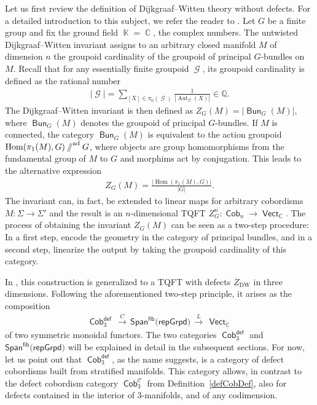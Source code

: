 \documentclass[pdftex]{sigma}
\DeclareMathOperator{\Hom}{Hom}
\DeclareMathOperator{\Aut}{Aut}
\DeclareMathOperator{\Bun}{\mathsf{Bun}}
\DeclareMathOperator{\vect}{\mathsf{Vect}}
\DeclareMathOperator{\K}{\mathbb{K}}
\DeclareMathOperator{\C}{\mathbb{C}}
\DeclareMathOperator{\Cob}{\mathsf{Cob}}
\DeclareMathOperator{\calc}{\mathcal{C}}
\DeclareMathOperator{\calg}{\mathcal{G}}
\newcommand{\sslash}{\mathbin{/\mkern-6mu/}}
\numberwithin{equation}{section}
\theoremstyle{definition}
\begin{document}
Let us first review the definition of Dijkgraaf--Witten theory without defects. For a detailed introduction to this subject, we refer the reader to \cite{FSW}. Let $G$ be a finite group and fix the ground field $\K = \C$, the complex numbers. The untwisted Dijkgraaf--Witten invariant assigns to an arbitrary closed manifold $M$ of dimension $n$ the groupoid cardinality of the groupoid of principal $G$-bundles on $M$. Recall that for any essentially finite groupoid $\calg$, its groupoid cardinality is defined as the rational number
\begin{align}
 \label{eqGrCard}
 |\calg| = \sum_{[X] \in \pi_0(\calg)}\frac{1}{|{\Aut_{\calg}(X)}|} \in \mathbb{Q}.
\end{align}
The Dijkgraaf--Witten invariant is then defined as $Z_G(M) = |{\Bun_G(M)}|$, where $\Bun_G(M)$ denotes the groupoid of principal $G$-bundles. If $M$ is connected, the category $\Bun_G(M)$ is equivalent to the action groupoid $\Hom(\pi_1(M), G)\sslash^{\mathrm{ad}} G$, where objects are group homomorphisms from the fundamental group of $M$ to $G$ and morphims act by conjugation. This leads to the alternative expression
\begin{align*}
 Z_G(M) = \frac{|{\Hom(\pi_1(M), G)|}}{|G|}.
\end{align*}
The invariant can, in fact, be extended to linear maps for arbitrary cobordisms $M\colon \Sigma \rightarrow \Sigma'$ and the result is an $n$-dimensional TQFT $Z_G^n\colon \Cob_n \rightarrow \vect_{\C}$. The process of obtaining the invariant $Z_G(M)$ can be seen as a two-step procedure: In a first step, encode the geometry in the category of principal bundles, and in a second step, linearize the output by taking the groupoid cardinality of this category.

In \cite{FMM}, this construction is generalized to a TQFT with defects $Z_{\mathrm{DW}}$ in three dimensions. Following the aforementioned two-step principle, it arises as the composition
\begin{align}
 \label{eqDefCob}
 \Cob_3^{\mathsf{def}} \, \xrightarrow{C} \, \mathsf{Span}^{\mathsf{fib}}(\mathsf{repGrpd)} \, \xrightarrow{L} \, \vect_{\C}
\end{align}
of two symmetric monoidal functors. The two categories $\Cob_3^{\mathsf{def}}$ and $\mathsf{Span}^{\mathsf{fib}}(\mathsf{repGrpd)}$ will be explained in detail in the subsequent sections. For now, let us point out that $\Cob_3^{\mathsf{def}}$, as the name suggests, is a category of defect cobordisms built from stratified manifolds. This category allows, in contrast to the defect cobordism category $\Cob_3^{\calc}$ from Definition~\ref{defCobDef}, also for defects contained in the interior of 3-manifolds, and of any codimension.
\end{document}

